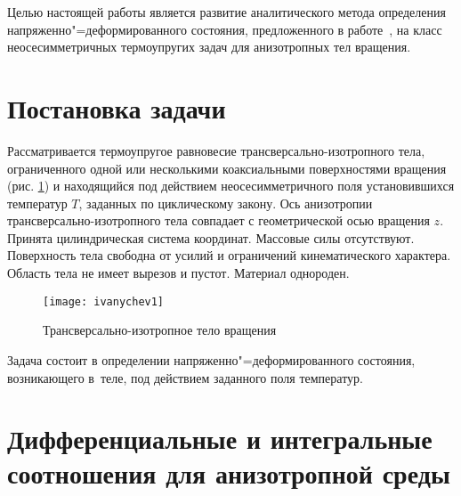 \documentclass[press]{vestnik}
\begin{document}
Целью настоящей работы является развитие аналитического метода определения 
напряженно"=деформированного состояния, предложенного в работе~\cite{B10}, на класс 
неосесимметричных термоупругих задач для анизотропных тел вращения.

\section{Постановка задачи}

Рассматривается термоупругое равновесие трансверсально-изотропного тела, 
ограниченного одной или несколькими коаксиальными поверхностями вращения 
(рис. \ref{fig1}) и находящийся под действием неосесимметричного поля установившихся 
температур $T$, заданных по циклическому закону. Ось анизотропии 
трансверсально-изотропного тела совпадает с геометрической осью вращения 
$z$. Принята цилиндрическая система координат. Массовые силы отсутствуют. 
Поверхность тела свободна от усилий и ограничений кинематического характера. 
Область тела не имеет вырезов и пустот. Материал однороден.

\begin{figure}[h]
\centering
\texttt{[image: ivanychev1]}
\caption{Трансверсально-изотропное тело вращения}
\label{fig1}
\end{figure}

Задача состоит в определении напряженно"=деформированного состояния, 
возникающего в~теле, под действием заданного поля температур.

\section{Дифференциальные и интегральные соотношения для анизотропной среды}
\end{document}
